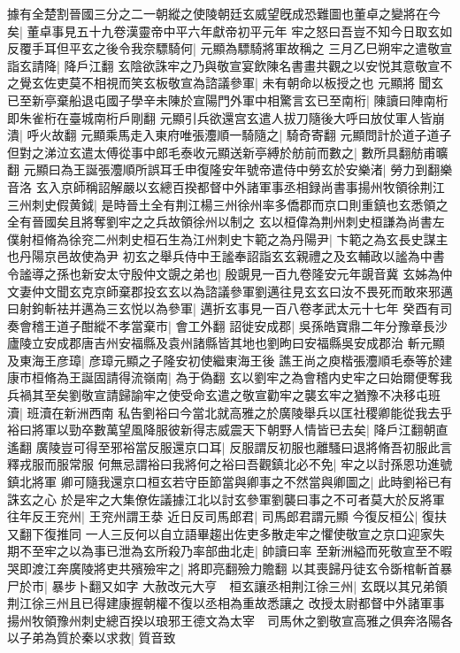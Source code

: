 據有全楚割晉國三分之二一朝縱之使陵朝廷玄威望旣成恐難圖也董卓之變將在今矣|{
	董卓事見五十九卷漢靈帝中平六年獻帝初平元年}
牢之怒曰吾豈不知今日取玄如反覆手耳但平玄之後令我奈驃騎何|{
	元顯為驃騎將軍故稱之}
三月乙巳朔牢之遣敬宣詣玄請降|{
	降戶江翻}
玄陰欲誅牢之乃與敬宣宴飲陳名書畫共觀之以安悦其意敬宣不之覺玄佐吏莫不相視而笑玄板敬宣為諮議參軍|{
	未有朝命以板授之也}
元顯將聞玄已至新亭棄船退屯國子學辛未陳於宣陽門外軍中相驚言玄已至南桁|{
	陳讀曰陣南桁即朱雀桁在臺城南桁戶剛翻}
元顯引兵欲還宫玄遣人拔刀隨後大呼曰放仗軍人皆崩潰|{
	呼火故翻}
元顯乘馬走入東府唯張灋順一騎隨之|{
	騎奇寄翻}
元顯問計於道子道子但對之涕泣玄遣太傅從事中郎毛泰收元顯送新亭縛於舫前而數之|{
	數所具翻舫甫曠翻}
元顯曰為王誕張灋順所誤耳壬申復隆安年號帝遣侍中勞玄於安樂渚|{
	勞力到翻樂音洛}
玄入京師稱詔解嚴以玄總百揆都督中外諸軍事丞相録尚書事揚州牧領徐荆江三州刺史假黄鉞|{
	是時晉土全有荆江楊三州徐州率多僑郡而京口則重鎮也玄悉領之全有晉國矣且將奪劉牢之之兵故領徐州以制之}
玄以桓偉為荆州刺史桓謙為尚書左僕射桓脩為徐兖二州刺史桓石生為江州刺史卞範之為丹陽尹|{
	卞範之為玄長史謀主也丹陽京邑故使為尹}
初玄之舉兵侍中王謐奉詔詣玄玄親禮之及玄輔政以謐為中書令謐導之孫也新安太守殷仲文覬之弟也|{
	殷覬見一百九卷隆安元年覬音冀}
玄姊為仲文妻仲文聞玄克京師棄郡投玄玄以為諮議參軍劉邁往見玄玄曰汝不畏死而敢來邪邁曰射鉤斬袪并邁為三玄悦以為參軍|{
	邁折玄事見一百八卷孝武太元十七年}
癸酉有司奏會稽王道子酣縱不孝當棄市|{
	會工外翻}
詔徙安成郡|{
	吳孫皓寶鼎二年分豫章長沙廬陵立安成郡唐吉州安福縣及袁州諸縣皆其地也劉昫曰安福縣吳安成郡治}
斬元顯及東海王彦璋|{
	彦璋元顯之子隆安初使繼東海王後}
譙王尚之庾楷張灋順毛泰等於建康市桓脩為王誕固請得流嶺南|{
	為于偽翻}
玄以劉牢之為會稽内史牢之曰始爾便奪我兵禍其至矣劉敬宣請歸諭牢之使受命玄遣之敬宣勸牢之襲玄牢之猶豫不决移屯班瀆|{
	班瀆在新洲西南}
私告劉裕曰今當北就高雅之於廣陵舉兵以匡社稷卿能從我去乎裕曰將軍以勁卒數萬望風降服彼新得志威震天下朝野人情皆已去矣|{
	降戶江翻朝直遙翻}
廣陵豈可得至邪裕當反服還京口耳|{
	反服謂反初服也離騷曰退將脩吾初服此言釋戎服而服常服}
何無忌謂裕曰我將何之裕曰吾觀鎮北必不免|{
	牢之以討孫恩功進號鎮北將軍}
卿可隨我還京口桓玄若守臣節當與卿事之不然當與卿圖之|{
	此時劉裕已有誅玄之心}
於是牢之大集僚佐議據江北以討玄參軍劉襲曰事之不可者莫大於反將軍往年反王兖州|{
	王兖州謂王㳟}
近日反司馬郎君|{
	司馬郎君謂元顯}
今復反桓公|{
	復扶又翻下復推同}
一人三反何以自立語畢趨出佐吏多散走牢之懼使敬宣之京口迎家失期不至牢之以為事已泄為玄所殺乃率部曲北走|{
	帥讀曰率}
至新洲縊而死敬宣至不暇哭即渡江奔廣陵將吏共殯殮牢之|{
	將即亮翻殮力贍翻}
以其喪歸丹徒玄令斲棺斬首暴尸於市|{
	暴步卜翻又如字}
大赦改元大亨　桓玄讓丞相荆江徐三州|{
	玄既以其兄弟領荆江徐三州且已得建康握朝權不復以丞相為重故悉讓之}
改授太尉都督中外諸軍事揚州牧領豫州刺史總百揆以琅邪王德文為太宰　司馬休之劉敬宣高雅之俱奔洛陽各以子弟為質於秦以求救|{
	質音致}
